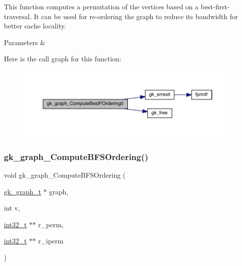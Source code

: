This function computes a permutation of the vertices based on a best-\/first-\/traversal. It can be used for re-\/ordering the graph to reduce its bandwidth for better cache locality.


\begin{DoxyParams}{Parameters}
{\em } & \\
\hline
\end{DoxyParams}
Here is the call graph for this function\+:\nopagebreak
\begin{figure}[H]
\begin{center}
\leavevmode
\includegraphics[width=350pt]{a00846_a698b40792daaa90d9a47c2dcfd2c07d3_cgraph}
\end{center}
\end{figure}
\mbox{\label{a00846_afc3115833e0ad293dbe9fd4028b12f20}} 
\subsubsection{\texorpdfstring{gk\+\_\+graph\+\_\+\+Compute\+B\+F\+S\+Ordering()}{gk\_graph\_ComputeBFSOrdering()}}
{\footnotesize\ttfamily void gk\+\_\+graph\+\_\+\+Compute\+B\+F\+S\+Ordering (\begin{DoxyParamCaption}\item[{\hyperlink{a00638}{gk\+\_\+graph\+\_\+t} $\ast$}]{graph,  }\item[{int}]{v,  }\item[{\hyperlink{a00119_a37994e3b11c72957c6f454c6ec96d43d}{int32\+\_\+t} $\ast$$\ast$}]{r\+\_\+perm,  }\item[{\hyperlink{a00119_a37994e3b11c72957c6f454c6ec96d43d}{int32\+\_\+t} $\ast$$\ast$}]{r\+\_\+iperm }\end{DoxyParamCaption})}

